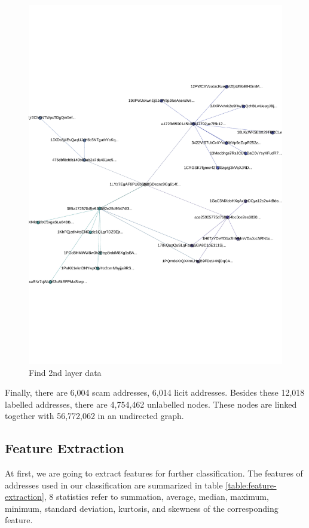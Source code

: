 \begin{figure}[tbp]
\centerline{\includegraphics[width=\columnwidth]{images/2-layer-data-expand.pdf}}
\caption{Find 2nd layer data}
\label{fig:2-layer-data-expand}
\end{figure}

Finally, there are 6,004 scam addresses, 6,014 licit addresses. Besides these 12,018 labelled addresses, there are 4,754,462 unlabelled nodes. These nodes are linked together with 56,772,062 in an undirected graph.


\subsection{Feature Extraction}
\label{sec:feature-extraction}
At first, we are going to extract features for further classification. The features of addresses used in our classification are summarized in table \ref{table:feature-extraction}, 8 statistics refer to summation, average, median, maximum, minimum, standard deviation, kurtosis, and skewness of the corresponding feature.

